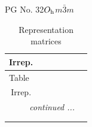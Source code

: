 \documentclass[fleqn,8pt,landscape]{jsarticle}
\begin{document}
\setcounter{MaxMatrixCols}{32}

\renewcommand{\tablename}{Table~}
\renewcommand{\figurename}{Figure~}
\begin{center}
\LARGE
PG No. 32\quad$O_{\rm h}$\quad$m\bar{3}m$\quad[ cubic ]
\end{center}
\renewcommand{\arraystretch}{1.2}
\begin{longtable}{ccccccc}
\caption{Representation matrices}
 \\
 \hline \hline
Irrep. &  &  &  &  &  &  \\ \hline \endfirsthead

\multicolumn{6}{l}{\tablename\ \thetable{}} \\
 \hline \hline
Irrep. &  &  &  &  &  &  \\ \hline \endhead

 \hline \hline
\multicolumn{6}{r}{\footnotesize\it continued ...} \\ \endfoot

 \hline \hline
\multicolumn{6}{r}{} \\ \endlastfoot


\end{longtable}
\end{document}
